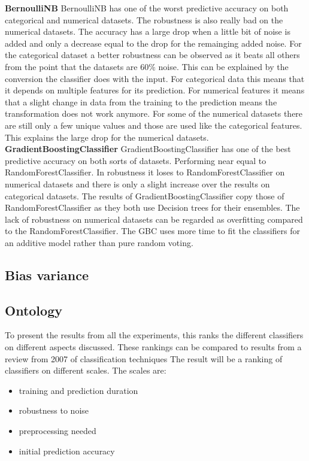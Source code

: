 \documentclass[a4paper,10pt]{article}
\begin{document}
\textbf{BernoulliNB} BernoulliNB has one of the worst predictive accuracy on both categorical and numerical datasets. The robustness is also really  bad on the numerical datasets. The accuracy has a large drop when a little bit of noise is added and only a decrease equal to the drop for the remainging added noise. For the categorical dataset a better robustness can be observed as it beats all others from the point that the datasets are 60$\%$ noise. This can be explained by the conversion the classifier does with the input. For categorical data this means that it depends on multiple features for its prediction. For numerical features it means that a slight change in data from the training to the prediction means the transformation does not work anymore. For some of the numerical datasets there are still only a few unique values and those are used like the categorical features. This explains the large drop for the numerical datasets.  \\

\textbf{GradientBoostingClassifier} GradientBoostingClassifier has one of the best predictive accuracy on both sorts of datasets. Performing near equal to RandomForestClassifier. In robustness it loses to RandomForestClassifier on numerical datasets and there is only a slight increase over the results on categorical datasets. The results of GradientBoostingClassifier copy those of RandomForestClassifier as they both use Decision trees for their ensembles. The lack of robustness on numerical datasets can be regarded as overfitting compared to the RandomForestClassifier. The GBC uses more time to fit the classifiers for an additive model rather than pure random voting.\\


\subsection{Bias variance}


\subsection{Ontology}
To present the results from all the experiments, this ranks the different classifiers on different aspects discussed.
These rankings can be compared to results from a review from 2007 of classification techniques \cite{RevClass}
The result will be a ranking of classifiers on different scales. The scales are:
\begin{itemize}
	\item training and prediction duration
	\item robustness to noise
	\item preprocessing needed
	\item initial prediction accuracy
\end{itemize} 
\end{document}
